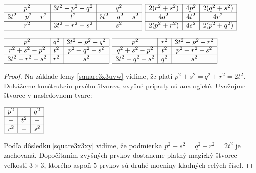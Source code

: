 \begin{center}
$\begin{array}{ |c|c|c| } 
\hline
p^2 & 3t^2 - p^2 - q^2 & q^2 \\ 
\hline
3t^2 - p^2 - r^2 & t^2 & 3t^2 - q^2 - s^2 \\ 
\hline
r^2 & 3t^2 - r^2 - s^2 & s^2 \\
\hline
\end{array}$
{}
$\begin{array}{ |c|c|c| } 
\hline
2(r^2 + s^2) & 4p^2 & 2(q^2 + s^2) \\ 
\hline
4q^2 & 4t^2 & 4r^2 \\ 
\hline
2(p^2 + r^2) & 4s^2 & 2(p^2 + q^2) \\
\hline
\end{array}$
\end{center}
\begin{center}
$\begin{array}{ |c|c|c| } 
\hline
p^2 & q^2 & 3t^2 - p^2 - q^2 \\ 
\hline
r^2 + s^2 - p^2 & t^2 & p^2 + q^2 - s^2 \\ 
\hline
3t^2 - r^2 - s^2 & r^2 & s^2 \\
\hline
\end{array}$
{}
$\begin{array}{ |c|c|c| } 
\hline
p^2 & r^2 & 3t^2 - p^2 - r^2 \\ 
\hline
q^2 + s^2 - p^2 & t^2 & p^2 + r^2 - s^2 \\ 
\hline
3t^2 - q^2 - s^2 & q^2 & s^2 \\
\hline
\end{array}$
\end{center}

\begin{proof}
Na základe lemy \ref{square3x3uvw} vidíme, že platí $p^2 + s^2 = q^2 + r^2 = 2t^2$. Dokážeme konštrukciu prvého štvorca, zvyšné prípady sú analogické. Uvažujme štvorec v nasledovnom tvare:

\begin{center}
$\begin{array}{ |c|c|c| } 
\hline
p^2 & - & q^2 \\ 
\hline
- & t^2 & - \\ 
\hline
r^2 & - & s^2 \\
\hline
\end{array}$
\end{center}

Podľa dôsledku \ref{square3x3xy} vidíme, že podmienka $p^2 + s^2 = q^2 + r^2 = 2t^2$ je zachovaná. Dopočítaním zvyšných prvkov dostaneme platný magický štvorec veľkosti $3 \times 3$, ktorého aspoň $5$ prvkov sú druhé mocniny kladných celých čísel.
\end{proof}

